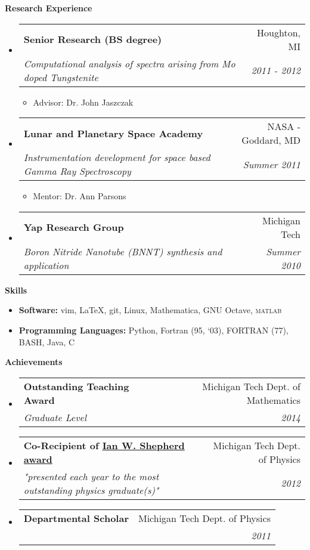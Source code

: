 \documentclass[letterpaper,11pt]{article}
\makeatletter
\newcommand{\resitem}[1]{\item #1 \vspace{-2pt}}
\newcommand{\resheading}[1]{{\large \textbf{#1}}}
\newcommand{\ressubheading}[4]{
\begin{tabular*}{6.5in}{l@{\extracolsep{\fill}}r}
		\textbf{#1} & #2 \\
		\textit{#3} & \textit{#4} \\
\end{tabular*}\vspace{-6pt}}
\makeatother
\begin{document}
\resheading{Research Experience}
\begin{itemize}
\item%
	\ressubheading{Senior Research (BS degree)}{Houghton, MI}{Computational analysis of spectra arising from Mo doped Tungstenite}{2011 - 2012}
	{\footnotesize
	\begin{itemize}
		\resitem{Advisor: Dr. John Jaszczak}
	\end{itemize}
	}
\item%
	\ressubheading{Lunar and Planetary Space Academy}{NASA - Goddard, MD}{Instrumentation development for space based Gamma Ray Spectroscopy}{Summer 2011}
	{\footnotesize
	\begin{itemize}
		\resitem{Mentor: Dr. Ann Parsons}
	\end{itemize}
	}
\item%
	\ressubheading{Yap Research Group}{Michigan Tech}{Boron Nitride Nanotube (BNNT) synthesis and application}{Summer 2010}
\end{itemize}

\resheading{Skills}
\begin{itemize}
  \resitem{\textbf{Software:} vim, \LaTeX, git, Linux, Mathematica, GNU Octave, \textsc{matlab}}
  \resitem{\textbf{Programming Languages:} Python, Fortran (95, `03), FORTRAN (77), BASH, Java, C}
\end{itemize}

\resheading{Achievements}
\begin{itemize}
\item
\ressubheading{Outstanding Teaching Award}{Michigan Tech Dept. of Mathematics}{Graduate Level}{2014}
\item
\ressubheading{Co-Recipient of \href{http://www.mtu.edu/physics/department/profile/awards/shepherd.html}{Ian W. Shepherd award}}{Michigan Tech Dept. of Physics}{"presented each year to the most outstanding physics graduate(s)"}{2012}
\item
\ressubheading{Departmental Scholar}{Michigan Tech Dept. of Physics}{}{2011}

\end{itemize}
\end{document}
